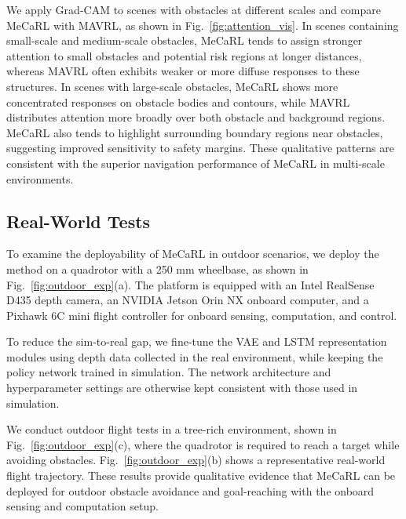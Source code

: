 \documentclass[letterpaper, 10 pt, conference]{ieeeconf}  %
\begin{document}
We apply Grad-CAM to scenes with obstacles at different scales and compare MeCaRL with MAVRL, as shown in Fig.~\ref{fig:attention_vis}. 
In scenes containing small-scale and medium-scale obstacles, MeCaRL tends to assign stronger attention to small obstacles and potential risk regions at longer distances, 
whereas MAVRL often exhibits weaker or more diffuse responses to these structures. 
In scenes with large-scale obstacles, MeCaRL shows more concentrated responses on obstacle bodies and contours, while MAVRL distributes attention more broadly over both obstacle and background regions. 
MeCaRL also tends to highlight surrounding boundary regions near obstacles, suggesting improved sensitivity to safety margins. 
These qualitative patterns are consistent with the superior navigation performance of MeCaRL in multi-scale environments.


\subsection{Real-World Tests}

To examine the deployability of MeCaRL in outdoor scenarios, we deploy the method on a quadrotor with a 250 mm wheelbase, as shown in Fig.~\ref{fig:outdoor_exp}(a). 
The platform is equipped with an Intel RealSense D435 depth camera, an NVIDIA Jetson Orin NX onboard computer, and a Pixhawk 6C mini flight controller for onboard sensing, computation, and control.

To reduce the sim-to-real gap, we fine-tune the VAE and LSTM representation modules using depth data collected in the real environment, while keeping the policy network trained in simulation. 
The network architecture and hyperparameter settings are otherwise kept consistent with those used in simulation.

We conduct outdoor flight tests in a tree-rich environment, shown in Fig.~\ref{fig:outdoor_exp}(c), where the quadrotor is required to reach a target while avoiding obstacles. 
Fig.~\ref{fig:outdoor_exp}(b) shows a representative real-world flight trajectory. 
These results provide qualitative evidence that MeCaRL can be deployed for outdoor obstacle avoidance and goal-reaching with the onboard sensing and computation setup.
\end{document}
